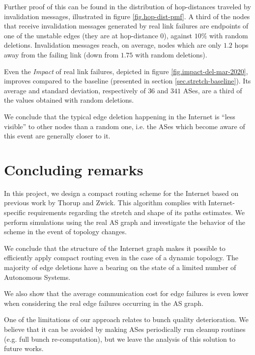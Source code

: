 \documentclass[a4paper,11pt,oneside]{report}
\begin{document}
Further proof of this can be found in the distribution of hop-distances traveled by invalidation messages, illustrated in figure \ref{fig.hop-dist-pmf}. A third of the nodes that receive invalidation messages generated by real link failures are endpoints of one of the unstable edges (they are at hop-distance $0$), against $10\%$ with random deletions. Invalidation messages reach, on average, nodes which are only $1.2$ hops away from the failing link (down from $1.75$ with random deletions).

Even the \textit{Impact} of real link failures, depicted in figure \ref{fig.impact-del-mar-2020}, improves compared to the baseline (presented in section \ref{sec.stretch-baseline}). Its average and standard deviation, respectively of $36$ and $341$ ASes, are a third of the values obtained with random deletions.

We conclude that the typical edge deletion happening in the Internet is ``less visible'' to other nodes than a random one, i.e. the ASes which become aware of this event are generally closer to it.

\chapter*{Concluding remarks}
In this project, we design a compact routing scheme for the Internet based on previous work by Thorup and Zwick. This algorithm complies with Internet-specific requirements regarding the stretch and shape of its paths estimates.
We perform simulations using the real AS graph and investigate the behavior of the scheme in the event of topology changes. 

\bigskip
We conclude that the structure of the Internet graph makes it possible to efficiently apply compact routing even in the case of a dynamic topology. The majority of edge deletions have a bearing on the state of a limited number of Autonomous Systems.

\noindent
We also show that the average communication cost for edge failures is even lower when considering the real edge failures occurring in the AS graph. 

\bigskip
One of the limitations of our approach relates to bunch quality deterioration. We believe that it can be avoided by making ASes periodically run cleanup routines (e.g. full bunch re-computation), but we leave the analysis of this solution to future works.


\cleardoublepage
{}
{}
\nocite{*}
\printbibliography
\end{document}
